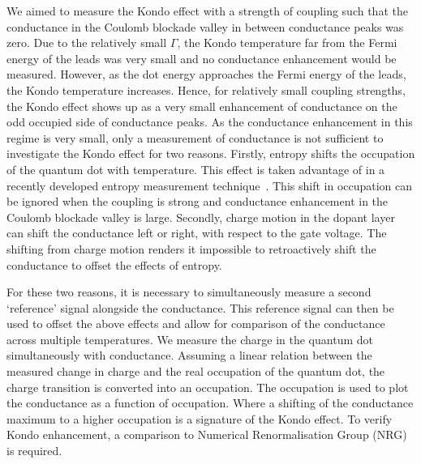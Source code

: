 We aimed to measure the Kondo effect with a strength of coupling such that the conductance in the Coulomb blockade valley in between conductance peaks was zero. Due to the relatively small $\Gamma$, the Kondo temperature far from the Fermi energy of the leads was very small and no conductance enhancement would be measured. However, as the dot energy approaches the Fermi energy of the leads, the Kondo temperature increases. Hence, for relatively small coupling strengths, the Kondo effect shows up as a very small enhancement of conductance on the odd occupied side of conductance peaks. As the conductance enhancement in this regime is very small, only a measurement of conductance is not sufficient to investigate the Kondo effect for two reasons. Firstly, entropy shifts the occupation of the quantum dot with temperature. This effect is taken advantage of in a recently developed entropy measurement technique~\cite{hartman, child_strong, child_meas}. This shift in occupation can be ignored when the coupling is strong and conductance enhancement in the Coulomb blockade valley is large. Secondly, charge motion in the dopant layer can shift the conductance left or right, with respect to the gate voltage. The shifting from charge motion renders it impossible to retroactively shift the conductance to offset the effects of entropy. 

For these two reasons, it is necessary to simultaneously measure a second `reference' signal alongside the conductance. This reference signal can then be used to offset the above effects and allow for comparison of the conductance across multiple temperatures. We measure the charge in the quantum dot simultaneously with conductance. Assuming a linear relation between the measured change in charge and the real occupation of the quantum dot, the charge transition is converted into an occupation. The occupation is used to plot the conductance as a function of occupation. Where a shifting of the conductance maximum to a higher occupation is a signature of the Kondo effect. To verify Kondo enhancement, a comparison to Numerical Renormalisation Group (NRG) is required. 




